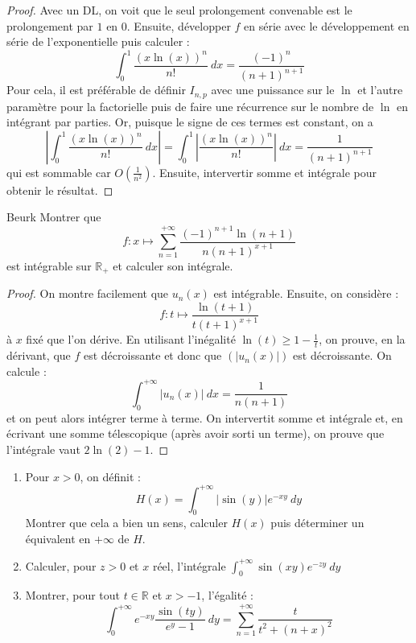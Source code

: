 \documentclass[french,a4paper]{article}
\newcommand{\R}{\mathbb{R}}
\theoremstyle{plain}
\theoremstyle{definition}
\theoremstyle{remark}
\begin{document}
\begin{proof}
	Avec un DL, on voit que le seul prolongement convenable est le prolongement par $1$ en $0$. Ensuite, développer $f$ en série avec le développement en série de l'exponentielle puis calculer : $$\int_{0}^{1}\frac{(x\ln(x))^n}{n!}\ dx=\frac{(-1)^n}{(n+1)^{n+1}}$$ Pour cela, il est préférable de définir $I_{n,p}$ avec une puissance sur le $\ln$ et l'autre paramètre pour la factorielle puis de faire une récurrence sur le nombre de $\ln$ en intégrant par parties. Or, puisque le signe de ces termes est constant, on a $$\left\lvert \int_{0}^{1}\frac{(x\ln(x))^n}{n!}\ dx\right\rvert=\int_{0}^{1}\left\lvert\frac{(x\ln(x))^n}{n!}\right\rvert\ dx=\frac{1}{(n+1)^{n+1}}$$ qui est sommable car $O\displaystyle\left(\frac{1}{n^2}\right)$. Ensuite, intervertir somme et intégrale pour obtenir le résultat.
\end{proof}

\begin{ex}[Moulin.IP.13]{Beurk}
	Montrer que $$f:x\mapsto\sum_{n=1}^{+\infty}\frac{(-1)^{n+1}\ln(n+1)}{n(n+1)^{x+1}}$$ est intégrable sur $\R_+$ et calculer son intégrale.
\end{ex}
\begin{proof}
	On montre facilement que $u_n(x)$ est intégrable. Ensuite, on considère : $$f:t\mapsto\frac{\ln(t+1)}{t(t+1)^{x+1}}$$ à $x$ fixé que l'on dérive. En utilisant l'inégalité $\ln(t)\geqslant1-\displaystyle\frac{1}{t}$, on prouve, en la dérivant, que $f$ est décroissante et donc que $(\lvert u_n(x)\rvert)$ est décroissante. On calcule : $$\int_{0}^{+\infty}\lvert u_n(x)\rvert\ dx=\frac{1}{n(n+1)}$$ et on peut alors intégrer terme à terme. On intervertit somme et intégrale et, en écrivant une somme télescopique (après avoir sorti un terme), on prouve que l'intégrale vaut $2\ln(2)-1$.
\end{proof}

\begin{ex}[Moulin.IP.14]{}
	\begin{enumerate}
		\item Pour $x>0$, on définit : $$H(x)=\int_{0}^{+\infty}\lvert \sin(y)\rvert e^{-xy}\ dy$$ Montrer que cela a bien un sens, calculer $H(x)$ puis déterminer un équivalent en $+\infty$ de $H$.
		\item Calculer, pour $z>0$ et $x$ réel, l'intégrale $\displaystyle\int_{0}^{+\infty}\sin(xy)e^{-zy}\ dy$
		\item Montrer, pour tout $t\in\R$ et $x>-1$, l'égalité : $$\int_{0}^{+\infty}e^{-xy}\frac{\sin(ty)}{e^y-1}\ dy=\sum_{n=1}^{+\infty}\frac{t}{t^2+(n+x)^2}$$
	\end{enumerate}
\end{ex}
\end{document}
